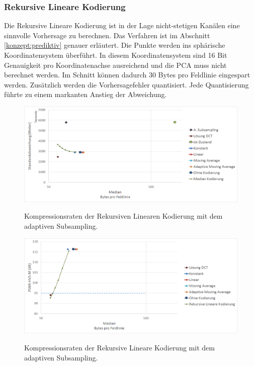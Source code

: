 \subsubsection{Rekursive Lineare Kodierung} \label{resultate:loesung2:wavelet}
Die Rekursive Lineare Kodierung ist in der Lage nicht-stetigen Kanälen eine sinnvolle Vorhersage zu berechnen. Das Verfahren ist im Abschnitt \ref{konzept:prediktiv} genauer erläutert. Die Punkte werden ins sphärische Koordinatensystem überführt. In diesem Koordinatensystem sind 16 Bit Genauigkeit pro Koordinatenachse ausreichend und die PCA muss nicht berechnet werden. Im Schnitt können dadurch $30$ Bytes pro Feldlinie eingespart werden. 
Zusätzlich werden die Vorhersagefehler quantisiert. Jede Quantisierung führte zu einem markanten Anstieg der Abweichung.\\
\begin{figure}[!htbp]
	\center
	\includegraphics[width=1\textwidth,keepaspectratio]{./pictures/resultate/loesung2/variante2/resultate.png}
		\label{resultate:loesung2:adaptive:median}
		\caption{Kompressionsraten der Rekursiven Linearen Kodierung mit dem adaptiven Subsampling.}
\end{figure}
\begin{figure}[!htbp]
	\includegraphics[width=1\textwidth,keepaspectratio]{./pictures/resultate/loesung2/variante2/resultate_psnr.png}
	\label{resultate:loesung2:adaptive:median_psnr}
	\caption{Kompressionsraten der Rekursive Lineare Kodierung mit dem adaptiven Subsampling.}
\end{figure}
